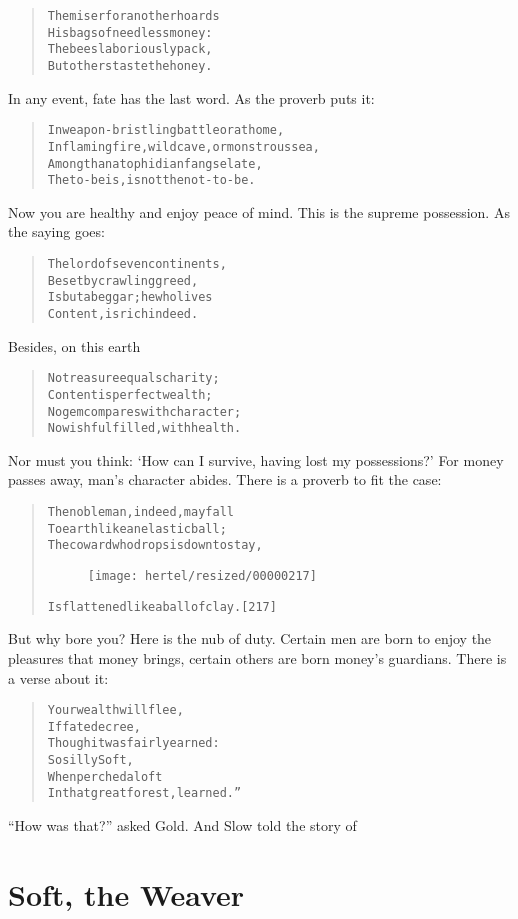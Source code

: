 \documentclass[article, twoside, 10pt]{memoir}
\renewenvironment{verbatim}{%
\begin{quote}%
\vskip -10pt%
\begin{alltt}\normalfont\small}{\end{alltt}%
\end{quote}%
\vskip -10pt
} %
\begin{document}
\begin{verbatim}
The miser for another hoards
    His bags of needless money:
The bees laboriously pack,
    But others taste the honey.
\end{verbatim}
In any event, fate has the last word. As the proverb puts it:

\begin{verbatim}
In weapon-bristling battle or at home,
    In flaming fire, wild cave, or monstrous sea,
Among thanatophidian fangs elate,
    The to-be is, is not the not-to-be.
\end{verbatim}
Now you are healthy and enjoy peace of mind. This is the supreme
possession. As the saying goes:

\begin{verbatim}
The lord of seven continents,
    Beset by crawling greed,
Is but a beggar; he who lives
    Content, is rich indeed.
\end{verbatim}
Besides, on this earth

\begin{verbatim}
No treasure equals charity;
    Content is perfect wealth;
No gem compares with character;
    No wish fulfilled, with health.
\end{verbatim}
Nor must you think:
`How can I survive, having lost my possessions?' For money passes
away, man's character abides. There is a proverb to fit the case:

\begin{verbatim}
The noble man, indeed, may fall
To earth{\textemdash}like an elastic ball;
The coward who drops is down to stay,
\begin{figure}[p]\texttt{[image: hertel/resized/00000217]}\end{figure}Is flattened like a ball of clay.                       [217]
\end{verbatim}
But why bore you? Here is the nub of duty. Certain men are born to
enjoy the pleasures that money brings, certain others are born
money's guardians. There is a verse about it:

\begin{verbatim}
Your wealth will flee,
If fate decree,
Though it was fairly earned:
    So silly Soft,
    When perched aloft
In that great forest, learned.”
\end{verbatim}
``How was that?'' asked Gold. And Slow told the story of

\chapter{Soft, the Weaver}
\end{document}
